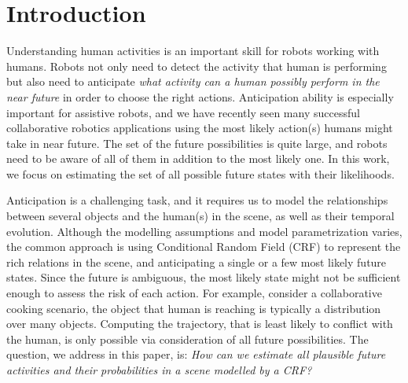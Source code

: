 

\section{Introduction}
\label{intro}
Understanding  human activities is an important skill for robots working with humans. Robots not only need to detect the activity that human is performing but also need to anticipate \emph{what activity can a human possibly perform in the near future} in order to choose the right actions. Anticipation ability is especially important for assistive robots, and we have recently seen many successful collaborative robotics applications \cite{collob1,collob2,hemaISER} using the most likely action(s) humans might take in near future.
The set of the future possibilities is quite large, and robots need to be aware of all of them in addition to the most likely one. In this work, we focus on estimating the set of all possible future states with their likelihoods.


Anticipation is a challenging task, and it requires us to model the relationships between several objects and the human(s) in the scene, as well as their temporal evolution. Although the modelling assumptions and model parametrization varies, the common approach \cite{hemaAnt,gpcrf,hemaECCV,tian} is using Conditional Random Field (CRF) to represent the rich relations in the scene, and anticipating a single or a few most likely future states. Since the future is ambiguous, the most likely state might not be sufficient enough to assess the risk of each action. For example, consider a collaborative cooking scenario, the object that human is reaching is typically a distribution over many objects. Computing the trajectory, that is least likely to conflict with the human, is only possible via consideration of all future possibilities. The question, we address in this paper, is: \emph{How can we estimate all plausible future activities and their probabilities in a scene modelled by a CRF?}



